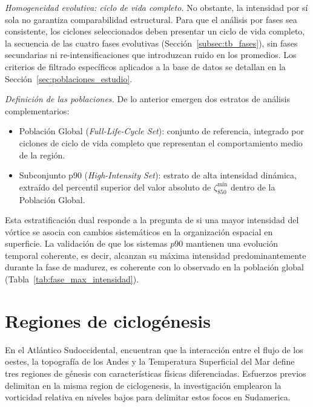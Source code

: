 \textit{Homogeneidad evolutiva: ciclo de vida completo.} No obstante, la intensidad por sí sola no garantiza comparabilidad estructural. 
Para que el análisis por fases sea consistente, los ciclones seleccionados deben presentar un ciclo de vida completo, la secuencia de las cuatro fases evolutivas (Sección~\ref{subsec:tb_fases}), sin fases secundarias ni re-intensificaciones que introduzcan ruido en los promedios. 
Los criterios de filtrado específicos aplicados a la base de datos se detallan en la Sección~\ref{sec:poblaciones_estudio}.

\textit{Definición de las poblaciones.} De lo anterior emergen dos estratos de análisis complementarios:

\begin{itemize}
    \item Población Global (\textit{Full-Life-Cycle Set}): conjunto de referencia, integrado por ciclones de ciclo de vida completo que representan el comportamiento medio de la región.
    \item Subconjunto p90 (\textit{High-Intensity Set}): estrato de alta intensidad dinámica, extraído del percentil superior del valor absoluto de $\zeta_{850}^{\min}$ dentro de la Población Global.
\end{itemize}

Esta estratificación dual responde a la pregunta de si una mayor intensidad del vórtice se asocia con cambios sistemáticos en la organización espacial en superficie. 
La validación de que los sistemas $p90$ mantienen una evolución temporal coherente, es decir, alcanzan su máxima intensidad predominantemente durante la fase de madurez, es coherente con lo observado en la población global (Tabla~\ref{tab:fase_max_intensidad}).


\section{Regiones de ciclogénesis}\label{sec:tb_regiones}
En el Atlántico Sudoccidental, \citet{gramcianinov2019properties} encuentran que la interacción entre el flujo de los oestes, la topografía de los Andes \citep{gan1994influence} y la Temperatura Superficial del Mar define tres regiones de génesis con características físicas diferenciadas. Esfuerzos previos delimitan en la misma region de ciclogenesis, la investigación \citet{reboita2010south} emplearon la vorticidad relativa en niveles bajos para delimitar estos focos en Sudamerica.

